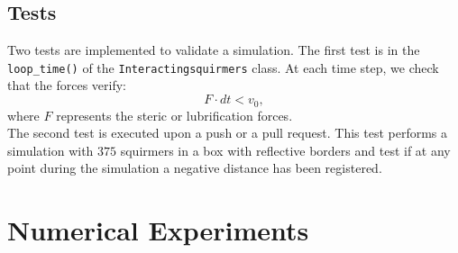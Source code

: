 \documentclass{article}
\begin{document}
\subsection{Tests}
Two tests are implemented to validate a simulation. The first test is in the \texttt{loop\_time()} of the \texttt{Interactingsquirmers} class.
At each time step, we check that the forces verify:
$$F\cdot dt < v_0,$$
where $F$ represents the steric or lubrification forces.\\
The second test is executed upon a push or a pull request. This test performs a simulation with $375$ squirmers in a box
with reflective borders and test if at any point during the simulation a negative distance has been registered.

\newpage
\section{Numerical Experiments}
\end{document}
